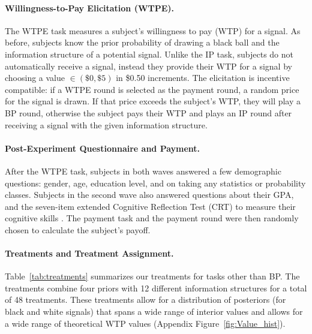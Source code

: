 \documentclass[12pt,a4paper]{article}
\begin{document}
\paragraph{Willingness-to-Pay Elicitation (WTPE).} The WTPE task measures a subject's willingness to pay (WTP) for a signal. As before, subjects know the prior probability of drawing a black ball and the information structure of a potential signal.  Unlike the IP task, subjects do not automatically receive a signal, instead they provide their WTP for a signal by choosing a value $\in (\$0,\$5)$ in \$0.50 increments. The elicitation is incentive compatible: if a WTPE round is selected as the payment round, a random price for the signal is drawn. If that price exceeds the subject's WTP, they will play a BP round, otherwise the subject pays their WTP and plays an IP round after receiving a signal with the given information structure.  

\paragraph{Post-Experiment Questionnaire and Payment.}  After the WTPE task, subjects in both waves answered a few demographic questions: gender, age, education level, and on taking any statistics or probability classes. Subjects in the second wave also answered questions about their GPA, and the seven-item extended Cognitive Reflection Test (CRT) to measure their cognitive skills \citep{toplak_assessing_2014}. The payment task and the payment round were then randomly chosen to calculate the subject's payoff.

\paragraph{Treatments and Treatment Assignment.} Table~\ref{tab:treatments} summarizes our treatments for tasks other than BP. The treatments combine four priors with 12 different information structures for a total of 48 treatments. These treatments allow for a distribution of posteriors (for black and white signals) that spans a wide range of interior values and allows for a wide range of theoretical WTP values (Appendix Figure~\ref{fig:Value_hist}). 
\end{document}
